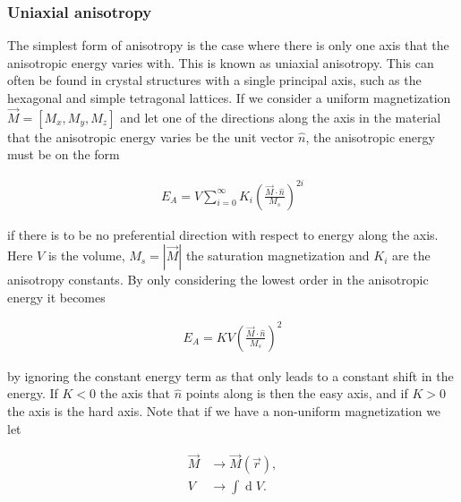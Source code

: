 \documentclass[1p]{elsarticle}		%
\renewcommand{\d}[1]{\ensuremath{\operatorname{d}\!{#1}}}
\numberwithin{equation}{section}
\begin{document}
\subsubsection{Uniaxial anisotropy}
The simplest form of anisotropy is the case where there is only one axis that the anisotropic energy varies with. This is known as uniaxial anisotropy. This can often be found in crystal structures with a single principal axis, such as the hexagonal and simple tetragonal lattices. If we consider a uniform magnetization $\vec{M} = \left[M_x, M_y, M_z\right]$ and let one of the directions along the axis in the material that the anisotropic energy varies be the unit vector $\hat{n}$, the anisotropic energy must be on the form

\begin{align}
\label{eq:uniaxialanisotropy}
E_A = V \sum_{i=0}^{\infty} K_i (\frac{\vec{M}\cdot\hat{n}}{M_s})^{2i}
\end{align}

if there is to be no preferential direction with respect to energy along the axis. Here $V$ is the volume, $M_s = |\vec{M}|$ the saturation magnetization and $K_i$ are the anisotropy constants. By only considering the lowest order in the anisotropic energy it becomes

\begin{align}
\label{eq:uniaxialanisotropy_v2}
E_A = K V (\frac{\vec{M}\cdot\hat{n}}{M_s})^2
\end{align}

by ignoring the constant energy term as that only leads to a constant shift in the energy. If $K < 0$ the axis that $\hat{n}$ points along is then the easy axis, and if $K > 0$ the axis is the hard axis. Note that if we have a non-uniform magnetization we let

\begin{align*}
\vec{M} &\rightarrow \vec{M}(\vec{r}), \\
V &\rightarrow \int \d V.
\end{align*}
\end{document}
